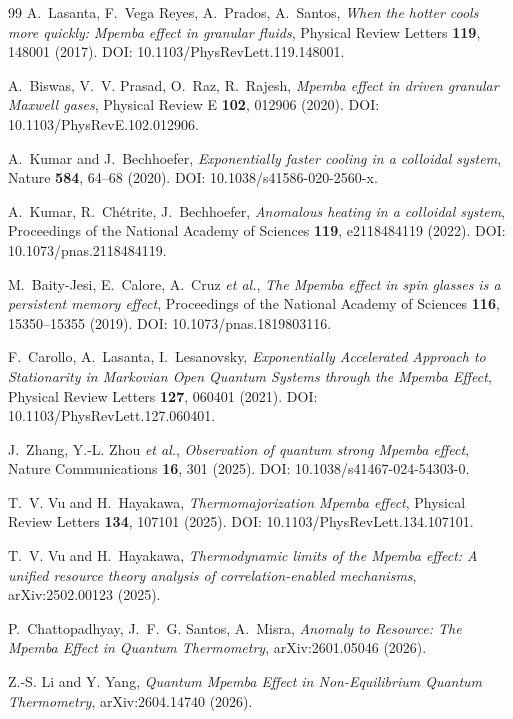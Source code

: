 \begin{thebibliography}{99}
A.~Lasanta, F.~Vega Reyes, A.~Prados, A.~Santos,
\emph{When the hotter cools more quickly: Mpemba effect in granular fluids},
Physical Review Letters \textbf{119}, 148001 (2017).
DOI: 10.1103/PhysRevLett.119.148001.

A.~Biswas, V.~V. Prasad, O.~Raz, R.~Rajesh,
\emph{Mpemba effect in driven granular Maxwell gases},
Physical Review E \textbf{102}, 012906 (2020).
DOI: 10.1103/PhysRevE.102.012906.

A.~Kumar and J.~Bechhoefer,
\emph{Exponentially faster cooling in a colloidal system},
Nature \textbf{584}, 64--68 (2020).
DOI: 10.1038/s41586-020-2560-x.

A.~Kumar, R.~Chétrite, J.~Bechhoefer,
\emph{Anomalous heating in a colloidal system},
Proceedings of the National Academy of Sciences \textbf{119}, e2118484119 (2022).
DOI: 10.1073/pnas.2118484119.

M.~Baity-Jesi, E.~Calore, A.~Cruz \emph{et al.},
\emph{The Mpemba effect in spin glasses is a persistent memory effect},
Proceedings of the National Academy of Sciences \textbf{116}, 15350--15355 (2019).
DOI: 10.1073/pnas.1819803116.

F.~Carollo, A.~Lasanta, I.~Lesanovsky,
\emph{Exponentially Accelerated Approach to Stationarity in Markovian Open Quantum Systems through the Mpemba Effect},
Physical Review Letters \textbf{127}, 060401 (2021).
DOI: 10.1103/PhysRevLett.127.060401.

J.~Zhang, Y.-L. Zhou \emph{et al.},
\emph{Observation of quantum strong Mpemba effect},
Nature Communications \textbf{16}, 301 (2025).
DOI: 10.1038/s41467-024-54303-0.

T.~V. Vu and H.~Hayakawa,
\emph{Thermomajorization Mpemba effect},
Physical Review Letters \textbf{134}, 107101 (2025).
DOI: 10.1103/PhysRevLett.134.107101.

T.~V. Vu and H.~Hayakawa,
\emph{Thermodynamic limits of the Mpemba effect: A unified resource theory analysis of correlation-enabled mechanisms},
arXiv:2502.00123 (2025).

P.~Chattopadhyay, J.~F.~G. Santos, A.~Misra,
\emph{Anomaly to Resource: The Mpemba Effect in Quantum Thermometry},
arXiv:2601.05046 (2026).

Z.-S. Li and Y. Yang,
\emph{Quantum Mpemba Effect in Non-Equilibrium Quantum Thermometry},
arXiv:2604.14740 (2026).


\end{thebibliography}
